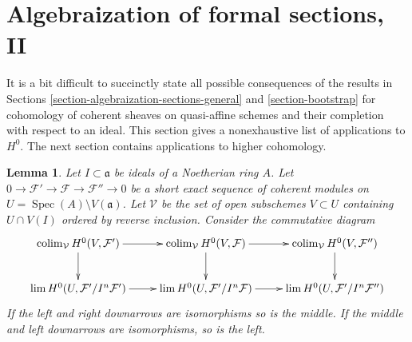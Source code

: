\documentclass{stacks-project}
\theoremstyle{plain}
\newtheorem{lemma}[subsection]{Lemma}
\theoremstyle{definition}
\theoremstyle{remark}
\numberwithin{equation}{subsection}
\def\lim{\mathop{\mathrm{lim}}\nolimits}
\def\colim{\mathop{\mathrm{colim}}\nolimits}
\def\Spec{\mathop{\mathrm{Spec}}}
\begin{document}
\section{Algebraization of formal sections, II}
\label{section-algebraization-sections-coherent}

\noindent
It is a bit difficult to succinctly state all possible
consequences of the results in
Sections \ref{section-algebraization-sections-general} and
\ref{section-bootstrap}
for cohomology of coherent sheaves on quasi-affine schemes
and their completion with respect to an ideal.
This section gives a nonexhaustive list of
applications to $H^0$. The next section contains
applications to higher cohomology.

\begin{lemma}
\label{lemma-ses-H0}
Let $I \subset \mathfrak a$ be ideals of a Noetherian ring $A$.
Let $0 \to \mathcal{F}' \to \mathcal{F} \to \mathcal{F}'' \to 0$
be a short exact sequence of coherent modules on
$U = \Spec(A) \setminus V(\mathfrak a)$. Let $\mathcal{V}$
be the set of open subschemes $V \subset U$ containing
$U \cap V(I)$ ordered by reverse inclusion.
Consider the commutative diagram
$$
\xymatrix{
\colim_\mathcal{V} H^0(V, \mathcal{F}') \ar[d] \ar[r] &
\colim_\mathcal{V} H^0(V, \mathcal{F}) \ar[d] \ar[r] &
\colim_\mathcal{V} H^0(V, \mathcal{F}'') \ar[d] \\
\lim H^0(U, \mathcal{F}'/I^n\mathcal{F}') \ar[r] &
\lim H^0(U, \mathcal{F}'/I^n\mathcal{F}) \ar[r] &
\lim H^0(U, \mathcal{F}'/I^n\mathcal{F}'')
}
$$
If the left and right downarrows are isomorphisms so is the middle.
If the middle and left downarrows are isomorphisms, so is the left.
\end{lemma}
\end{document}
